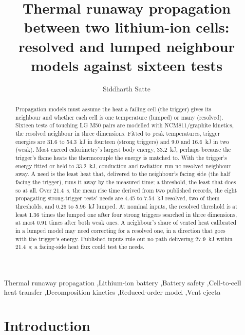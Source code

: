 \documentclass[preprint,12pt]{elsarticle}
\begin{document}
\begin{frontmatter}

\title{Thermal runaway propagation between two lithium-ion cells: resolved and lumped neighbour models against sixteen tests}

\author{Siddharth Satte}
\address{Independent researcher, Pune, India}

\begin{abstract}
Propagation models must assume the heat a failing cell (the trigger) gives its neighbour and whether each cell is one temperature (lumped) or many (resolved). Sixteen tests of touching LG M50 pairs are modelled with NCM811/graphite kinetics, the resolved neighbour in three dimensions. Fitted to peak temperatures, trigger energies are 31.6 to 54.3~kJ in fourteen (strong triggers) and 9.0 and 16.6~kJ in two (weak). Most exceed calorimetry's largest body energy, 33.2~kJ, perhaps because the trigger's flame heats the thermocouple the energy is matched to. With the trigger's energy fitted or held to 33.2~kJ, conduction and radiation run no resolved neighbour away. A need is the least heat that, delivered to the neighbour's facing side (the half facing the trigger), runs it away by the measured time; a threshold, the least that does so at all. Over 21.4~s, the mean rise time derived from two published records, the eight propagating strong-trigger tests' needs are 4.45 to 7.54~kJ resolved, two of them thresholds, and 0.26 to 5.96~kJ lumped. At nominal inputs, the resolved threshold is at least 1.36 times the lumped one after four strong triggers searched in three dimensions, at most 0.91 times after both weak ones. A neighbour's share of vented heat calibrated in a lumped model may need correcting for a resolved one, in a direction that goes with the trigger's energy. Published inputs rule out no path delivering 27.9~kJ within 21.4~s; a facing-side heat flux could test the needs.
\end{abstract}

\begin{keyword}
Thermal runaway propagation \sep Lithium-ion battery \sep Battery safety \sep Cell-to-cell heat transfer \sep Decomposition kinetics \sep Reduced-order model \sep Vent ejecta
\end{keyword}

\end{frontmatter}

\section{Introduction}
\label{sec:intro}
\end{document}
